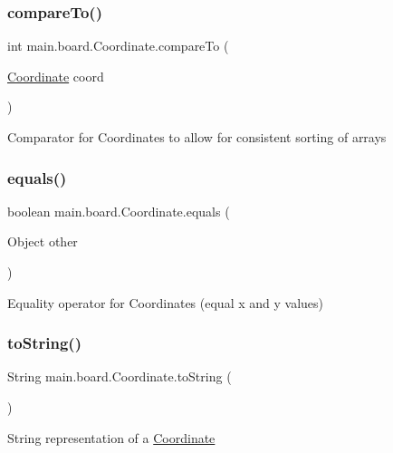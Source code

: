 \subsubsection{\texorpdfstring{compare\+To()}{compareTo()}}
{\footnotesize\ttfamily int main.\+board.\+Coordinate.\+compare\+To (\begin{DoxyParamCaption}\item[{\hyperlink{classmain_1_1board_1_1_coordinate}{Coordinate}}]{coord }\end{DoxyParamCaption})}

Comparator for Coordinates to allow for consistent sorting of arrays \hypertarget{classmain_1_1board_1_1_coordinate_aa81f54d6a109669ec5420494d71c0687}{}\label{classmain_1_1board_1_1_coordinate_aa81f54d6a109669ec5420494d71c0687} 
\subsubsection{\texorpdfstring{equals()}{equals()}}
{\footnotesize\ttfamily boolean main.\+board.\+Coordinate.\+equals (\begin{DoxyParamCaption}\item[{Object}]{other }\end{DoxyParamCaption})}

Equality operator for Coordinates (equal x and y values) \hypertarget{classmain_1_1board_1_1_coordinate_a8eb57ae3629081edbef2d9acf42b3fbb}{}\label{classmain_1_1board_1_1_coordinate_a8eb57ae3629081edbef2d9acf42b3fbb} 
\subsubsection{\texorpdfstring{to\+String()}{toString()}}
{\footnotesize\ttfamily String main.\+board.\+Coordinate.\+to\+String (\begin{DoxyParamCaption}{ }\end{DoxyParamCaption})}

String representation of a \hyperlink{classmain_1_1board_1_1_coordinate}{Coordinate} \hypertarget{classmain_1_1board_1_1_coordinate_afb35e6a6c03ad1680d058a1d1076c9e6}{}\label{classmain_1_1board_1_1_coordinate_afb35e6a6c03ad1680d058a1d1076c9e6} 
